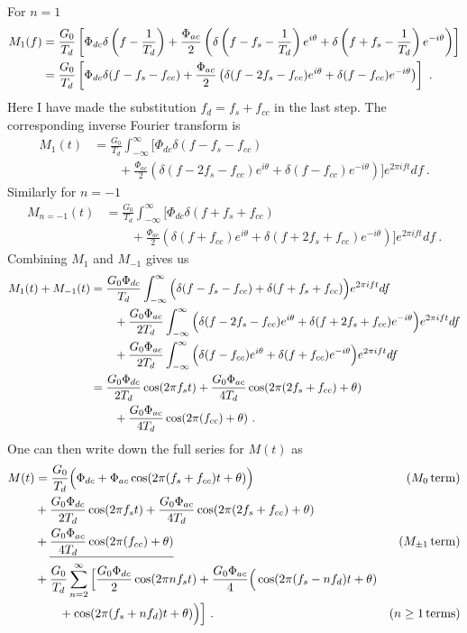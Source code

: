 \noindent
For $n=1$
\begin{align}
M_{1}(f)
&=\frac{G_0}{T_{d}}
\left[\Phi_{dc}\delta\left(f-\frac{1}{T_{d}}\right)+\frac{\Phi_{ac}}{2}\left(\delta\left( f-f_s-\frac{1}{T_{d}}\right)e^{i\theta}+\delta \left(f+f_s-\frac{1}{T_{d}}\right)e^{-i\theta}\right)\right] \notag\\
&=\frac{G_0}{T_{d}}\left[\Phi_{dc} \delta(f-f_s-f_{cc})+\frac{\Phi_{ac}}{2}\left(\delta(f-2f_s-f_{cc})e^{i\theta}+\delta(f-f_{cc})e^{-i\theta}\right)\right] \ .
\end{align}
\noindent 
Here I have made the substitution $f_d=f_s+f_{cc}$ in the last step. The corresponding inverse Fourier transform is
\begin{align}
M_{1}(t)
&= \frac{G_0}{T_{d}} \int_{-\infty}^{\infty} \Big[\Phi_{dc}\delta(f-f_s-f_{cc}) \\
& \qquad + \frac{\Phi_{ac}}{2} \left(\delta(f-2f_s-f_{cc})e^{i\theta}+\delta(f-f_{cc})e^{-i\theta}\right)\Big] e^{2 \pi i f t}df \ .
\end{align}
 Similarly for $n=-1$
\begin{align}
M_{n=-1}(t)
&= \frac{G_0}{T_{d}} \int_{-\infty}^{\infty} \Big[\Phi_{dc}\delta(f+f_s+f_{cc}) \\
& \qquad + \frac{\Phi_{ac}}{2} \left(\delta(f+f_{cc})e^{i\theta}+\delta(f+2f_s+f_{cc})e^{-i\theta}\right)\Big] e^{2 \pi i f t}df \ .
\end{align}
Combining $M_1$ and $M_{-1}$ gives us
\begin{align}
M_{1}(t) + M_{-1}(t)
&= \frac{G_0\Phi_{dc}}{T_{d}} \int_{-\infty}^{\infty} \Big(\delta(f-f_s-f_{cc})+\delta(f+f_s+f_{cc}) \Big)e^{2 \pi i f t}df \notag \\
& \qquad + \frac{G_0\Phi_{ac}}{2T_{d}} \int_{-\infty}^{\infty} \Big(\delta(f-2f_s-f_{cc})e^{i\theta} + \delta(f+2f_s+f_{cc})e^{-i\theta}\Big) e^{2 \pi i f t}df \notag \\
& \qquad + \frac{G_0\Phi_{ac}}{2T_{d}} \int_{-\infty}^{\infty} \Big(\delta(f-f_{cc})e^{i\theta} + \delta(f+f_{cc})e^{-i\theta}\Big) e^{2 \pi i f t}df \notag\\
&=\frac{G_0\Phi_{dc}}{2T_{d}} \cos(2\pi f_s t)+ \frac{G_0\Phi_{ac}}{4T_{d}} \cos(2\pi(2f_s+f_{cc})+\theta) \notag\\ 
& \qquad + \frac{G_0\Phi_{ac}}{4T_{d} }\cos(2\pi(f_{cc})+\theta) \ .
\end{align}
\noindent
One can then write down the full series for $M(t)$ as
\begin{align}
\label{eqn:Mfluence}
M(t)
&= \frac{G_0}{T_{d}}\Big(\Phi_{dc}+\Phi_{ac}\cos(2\pi (f_s+f_{cc})t+\theta)\Big) & (M_0\,{\rm term}) \notag\\
& + \frac{G_0\Phi_{dc}}{2T_{d}} \cos(2\pi f_s t)+ \frac{G_0\Phi_{ac}}{4T_{d}} \cos(2\pi(2f_s+f_{cc})+\theta) \notag\\
& + \underline{\frac{G_0\Phi_{ac}}{4T_{d} }\cos(2\pi(f_{cc})+\theta)} & (M_{\pm 1}\,{\rm term}) \notag\\
& + \frac{G_0}{T_d}\sum_{n=2}^{\infty}\Big[\frac{G_0\Phi_{dc}}{2} \cos(2 \pi n f_st) + \frac{G_0\Phi_{ac}}{4}\Big(\cos(2 \pi(f_s-n f_d)t+\theta) \notag\\
& \qquad + \cos(2 \pi(f_s+n f_d)t+\theta)\Big)\Big] \ . & (n\geq 1\,{\rm terms})
\end{align}
